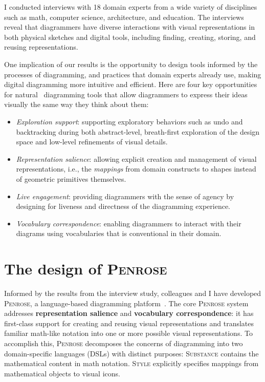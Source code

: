 \documentclass[12pt]{cmuthesis}
\makeatletter
\newcommand*{\ie}{i.e.\@\xspace}
\newcommand*{\Penrose}{\textsc{Penrose}\xspace}
\newcommand*{\Substance}{\textsc{Substance}\xspace}
\newcommand*{\Style}{\textsc{Style}\xspace}
\makeatother
\begin{document}
I conducted interviews with 18 domain experts from a wide variety of disciplines such as math, computer science, architecture, and education. The interviews reveal that diagrammers have diverse interactions with visual representations in both physical sketches and digital tools, including finding, creating, storing, and reusing representations. 

One implication of our results is the opportunity to design tools informed by the processes of diagramming, and practices that domain experts already use, making digital diagramming more intuitive and efficient. Here are four key opportunities for natural~\cite{naturalProgramming} diagramming tools that allow diagrammers to express their ideas visually the same way they think about them:

\begin{itemize} 
    \item \textit{Exploration support}: supporting exploratory behaviors such as undo and backtracking during both abstract-level, breath-first exploration of the design space and low-level refinements of visual details.
    \item \textit{Representation salience}: allowing explicit creation and management of visual representations, \ie, the \emph{mappings} from domain constructs to shapes instead of geometric primitives themselves.
    \item \textit{Live engagement}: providing diagrammers with the sense of agency by designing for liveness and directness of the diagramming experience. 
    \item \textit{Vocabulary correspondence}: enabling diagrammers to interact with their diagrams using vocabularies that is conventional in their domain.
\end{itemize}

\section{The design of \Penrose}
\label{sec:penrose}

Informed by the results from the interview study, colleagues and I have developed \Penrose, a language-based diagramming platform~\cite{penrose}. The core \Penrose system addresses \textbf{representation salience} and \textbf{vocabulary correspondence}: it has first-class support for creating and reusing visual representations and translates familiar math-like notation into one or more possible visual representations. To accomplish this, \Penrose decomposes the concerns of diagramming into two domain-specific languages (DSLs) with distinct purposes: \colorbox[HTML]{E7F3E7}{\Substance} contains the mathematical content in math notation. \colorbox[HTML]{DDDEED}{\Style} explicitly specifies mappings from mathematical objects to visual icons. 
\end{document}
